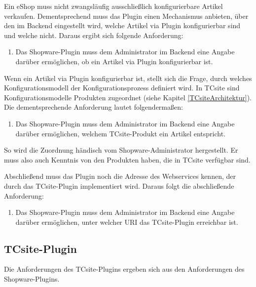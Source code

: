 \documentclass[11pt, a4paper, titlepage, listof=totoc, bibliography=totoc, index=totoc, twoside, openright, headings=normal]{scrreprt}
\begin{document}
Ein eShop muss nicht zwangsläufig ausschließlich konfigurierbare Artikel verkaufen. Dementsprechend muss das Plugin einen Mechanismus anbieten, über den im Backend eingestellt wird, welche Artikel via Plugin konfigurierbar sind und welche nicht. Daraus ergibt sich folgende Anforderung:
\begin{enumerate}[SW.F17:]\bfseries
\item Das Shopware-Plugin muss dem Administrator im Backend eine Angabe darüber ermöglichen, ob ein Artikel via Plugin konfigurierbar ist.
\end{enumerate}
Wenn ein Artikel via Plugin konfigurierbar ist, stellt sich die Frage, durch welches Konfigurationsmodell der Konfigurationsprozess definiert wird. In TCsite sind Konfigurationsmodelle Produkten zugeordnet (siehe Kapitel \ref{TCsiteArchitektur}). Die dementsprechende Anforderung lautet folgendermaßen:
\begin{enumerate}[SW.F18:]\bfseries
\item Das Shopware-Plugin muss dem Administrator im Backend eine Angabe darüber ermöglichen, welchem TCsite-Produkt ein Artikel entspricht.
\end{enumerate}
So wird die Zuordnung händisch vom Shopware-Administrator hergestellt. Er muss also auch Kenntnis von den Produkten haben, die in TCsite verfügbar sind.

Abschließend muss das Plugin noch die Adresse des Webservices kennen, der durch das TCsite-Plugin implementiert wird. Daraus folgt die abschließende Anforderung:
\begin{enumerate}[SW.F19:]\bfseries
\item Das Shopware-Plugin muss dem Administrator im Backend eine Angabe darüber ermöglichen, unter welcher URI das TCsite-Plugin erreichbar ist.
\end{enumerate}

\subsection{TCsite-Plugin}
Die Anforderungen des TCsite-Plugins ergeben sich aus den Anforderungen des Shopware-Plugins.
\end{document}
